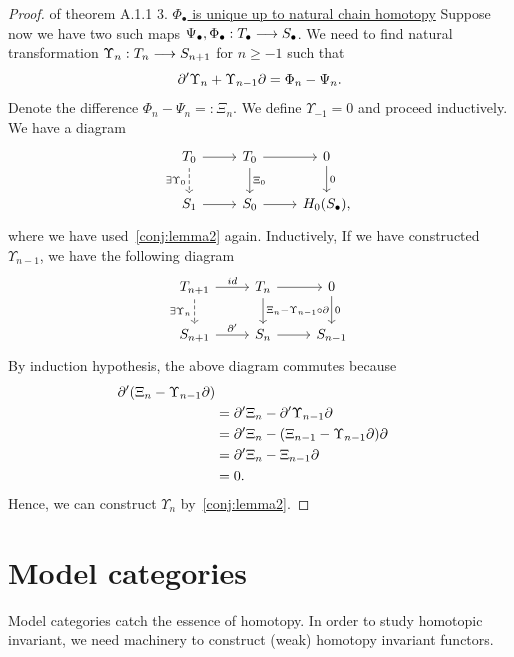 \documentclass[11pt]{book} %
\begin{document}
\begin{proof}{of theorem A.1.1}
3. \underline{$\Phi_\bullet$ is unique up to natural chain homotopy} Suppose now we have two such maps $\Psi_\bullet,\Phi_\bullet: T_\bullet\longrightarrow S_\bullet$. We need to find natural transformation $\Upsilon_n: T_{n}\longrightarrow S_{n+1}$ for $n\geq -1$ such that 
$$
{\partial}'\Upsilon_n+\Upsilon_{n-1}{\partial}=\Phi_n-\Psi_n.
$$
Denote the difference $\Phi_n-\Psi_n=:\Xi_n$. We define $\Upsilon_{-1}=0$ and proceed inductively. We have a diagram
\[
\begin{tikzcd}
T_0 \arrow[r] \arrow[d, "\exists\Upsilon_0"', dashed] & T_0 \arrow[d, "\Xi_0"] \arrow[r] & 0 \arrow[d, "0"] \\
S_1 \arrow[r] & S_0 \arrow[r] & H_0(S_\bullet),
\end{tikzcd}
\]
where we have used~\ref{conj:lemma2} again. Inductively, If we have constructed $\Upsilon_{n-1}$, we have the following diagram
\[
\begin{tikzcd}
T_{n+1} \arrow[r, "id"] \arrow[d, "\exists \Upsilon_{n}"', dashed] & T_n \arrow[d, "\Xi_n-\Upsilon_{n-1}\circ\pd"] \arrow[r] & 0 \arrow[d, "0"] \\
S_{n+1} \arrow[r, "\pd'"] & S_n \arrow[r] & S_{n-1}
\end{tikzcd}
\] 
By induction hypothesis, the above diagram commutes because
$$
\begin{aligned}
{\partial}'(\Xi_n-\Upsilon_{n-1}{\partial})\\
&={\partial}'\Xi_n-{\partial}'\Upsilon_{n-1}{\partial}\\
&={\partial}'\Xi_n-(\Xi_{n-1}-\Upsilon_{n-1}{\partial}){\partial}\\
&={\partial}'\Xi_n-\Xi_{n-1}{\partial}\\
&=0.
\end{aligned}
$$
Hence, we can construct $\Upsilon_{n}$ by~\ref{conj:lemma2}.
\end{proof}


\section{Model categories}
Model categories catch the essence of homotopy. In order to study homotopic invariant, we need machinery to construct (weak) homotopy invariant functors.
\end{document}
